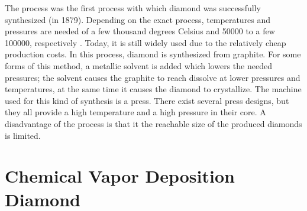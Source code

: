 	The \HPHT process was the first process with which diamond was successfully synthesized (in 1879).
	Depending on the exact process, temperatures and pressures are needed of a few thousand degrees Celsius and  \num{50000} to a few \num{100000}, respectively \cite{davis1993diamond}.
	Today, it is still widely used due to the relatively cheap production costs\cite{wikiSyntheticDiamond}.
	In this process, diamond is synthesized from graphite.
	For some forms of this method, a metallic solvent is added which lowers the needed pressures; the solvent causes the graphite to reach dissolve at lower pressures and temperatures, at the same time it causes the diamond to crystallize.
	The machine used for this kind of synthesis is a press.
	There exist several press designs, but they all provide a high temperature and a high pressure in their core.
	A disadvantage of the \HPHT process is that it the reachable size of the produced diamonds is limited.


	\section[CVD]{Chemical Vapor Deposition Diamond}

	\begin{figure}[tp]
		\begin{subfigure}[t]{ 0.49\linewidth}
			\caption{}\label{subfig::cvd_large}
			\centering
		\end{subfigure}
		\hfill
		\begin{subfigure}[t]{ 0.49\linewidth}
			\caption{}\label{subfig::cvd_detail}
			\centering
		\end{subfigure}
		\caption{}
		\label{fig::sem_cvd}
	\end{figure}

